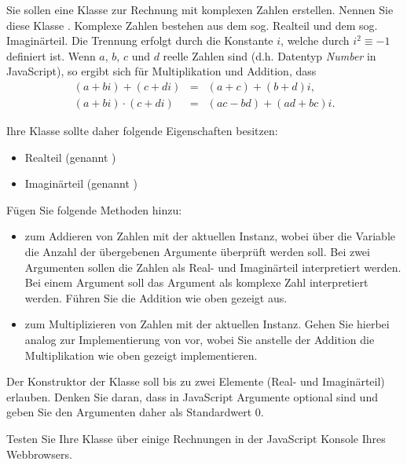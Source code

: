 %
\par Sie sollen eine Klasse zur Rechnung mit komplexen Zahlen erstellen. Nennen
Sie diese Klasse . Komplexe Zahlen bestehen aus dem sog. Realteil
und dem sog. Imaginärteil. Die Trennung erfolgt durch die Konstante $i$, welche
durch $i^2 \equiv -1$ definiert ist. Wenn $a$, $b$, $c$ und $d$ reelle Zahlen
sind (d.h. Datentyp \emph{Number} in JavaScript), so ergibt sich für
Multiplikation und Addition, dass
%
\begin{eqnarray}
(a + b i) + (c + d i)     & = & (a + c) + (b + d) i,\\
(a + b i) \cdot (c + d i) & = & (ac - bd) + (ad + bc) i.
\end{eqnarray}
%
\par Ihre Klasse sollte daher folgende Eigenschaften besitzen:
%
\begin{itemize}
\item
Realteil (genannt )
\item
Imaginärteil (genannt )
\end{itemize}
%
\par Fügen Sie folgende Methoden hinzu:
%
\begin{itemize}
\item
{} zum Addieren von Zahlen mit der aktuellen Instanz, wobei über die
Variable  die Anzahl der übergebenen Argumente überprüft
werden soll. Bei zwei Argumenten sollen die Zahlen als Real- und Imaginärteil
interpretiert werden. Bei einem Argument soll das Argument als komplexe Zahl
interpretiert werden. Führen Sie die Addition wie oben gezeigt aus.
%
\item
{} zum Multiplizieren von Zahlen mit der aktuellen Instanz. Gehen
Sie hierbei analog zur Implementierung von  vor, wobei Sie anstelle
der Addition die Multiplikation wie oben gezeigt implementieren.
\end{itemize}
%
\par Der Konstruktor der Klasse soll bis zu zwei Elemente (Real- und
Imaginärteil) erlauben. Denken Sie daran, dass in JavaScript Argumente optional
sind und geben Sie den Argumenten daher als Standardwert $0$.
%
\par Testen Sie Ihre Klasse über einige Rechnungen in der JavaScript Konsole
Ihres Webbrowsers.
